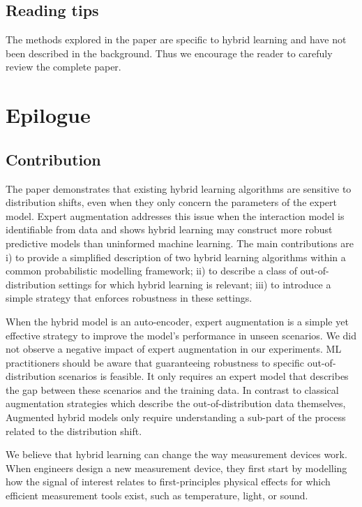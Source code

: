 \subsection{Reading tips}
The methods explored in the paper are specific to hybrid learning and have not been described in the background. Thus we encourage the reader to carefuly review the complete paper.



\section{Epilogue}
\subsection{Contribution}
The paper demonstrates that existing hybrid learning algorithms are sensitive to distribution shifts, even when they only concern the parameters of the expert model. Expert augmentation addresses this issue when the interaction model is identifiable from data and shows hybrid learning may construct more robust predictive models than uninformed machine learning. The main contributions are i) to provide a simplified description of two hybrid learning algorithms within a common probabilistic modelling framework; ii) to describe a class of out-of-distribution settings for which hybrid learning is relevant; iii) to introduce a simple strategy that enforces robustness in these settings.

When the hybrid model is an auto-encoder, expert augmentation is a simple yet effective strategy to improve the model's performance in unseen scenarios. We did not observe a negative impact of expert augmentation in our experiments. ML practitioners should be aware that guaranteeing robustness to specific out-of-distribution scenarios is feasible. It only requires an expert model that describes the gap between these scenarios and the training data. In contrast to classical augmentation strategies which describe the out-of-distribution data themselves, Augmented hybrid models only require understanding a sub-part of the process related to the distribution shift.

We believe that hybrid learning can change the way measurement devices work. When engineers design a new measurement device, they first start by modelling how the signal of interest relates to first-principles physical effects for which efficient measurement tools exist, such as temperature, light, or sound.


